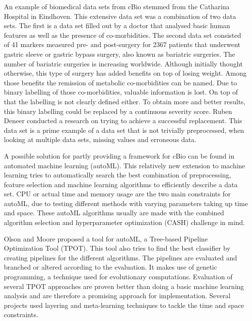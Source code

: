 \documentclass[10pt,a4paper]{article}
\begin{document}
	An example of biomedical data sets from cBio stemmed from the Catharina Hospital in Eindhoven. This extensive data set was a combination of two data sets. The first is a data set filled out by a doctor that analysed basic human features as well as the presence of co-morbidities. The second data set consisted of 41 markers measured pre- and post-surgery for 2367 patients that underwent gastric sleeve or gastric bypass surgery, also known as bariatric surgeries. The number of bariatric surgeries is increasing worldwide. Although initially thought otherwise, this type of surgery has added benefits on top of losing weight. Among those benefits the remission of metabolic co-morbidities can be named. Due to binary labelling of those co-morbidities, valuable information is lost. On top of that the labelling is not clearly defined either. To obtain more and better results, this binary labelling could be replaced by a continuous severity score. Ruben Deneer conducted a research on trying to achieve a successful replacement. This data set is a prime example of a data set that is not trivially preprocessed, when looking at multiple data sets, missing values and erroneous data.\cite{Deneer2017Thesis}
	
	A possible solution for partly providing a framework for cBio can be found in automated machine learning (autoML). This relatively new extension to machine learning tries to automatically search the best combination of preprocessing, feature selection and machine learning algorithms to efficiently describe a data set. CPU or actual time and memory usage are the two main constraints for autoML, due to testing different methods with varying parameters taking up time and space. These autoML algorithms usually are made with the combined algorithm selection and hyperparameter optimization (CASH) challenge in mind.\cite{feurer2015efficient} 
	
	Olson and Moore proposed a tool for autoML, a Tree-based Pipeline Optimization Tool (TPOT).\cite{olson2016tpot} This tool also tries to find the best classifier by creating pipelines for the different algorithms. The pipelines are evaluated and branched or altered according to the evaluation. It makes use of genetic programming, a technique used for evolutionary computations.\cite{banzhaf1998genetic} Evaluation of several TPOT approaches are proven better than doing a basic machine learning analysis and are therefore a promising approach for implementation. \cite{olson2016evaluation} Several projects used layering and meta-learning techniques to tackle the time and space constraints.\cite{Gijsbers2017Thesis}
	
\end{document}
